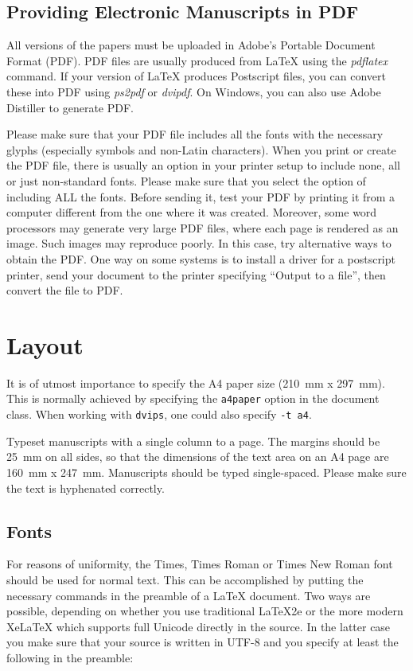 \documentclass{clarin}
\begin{document}
\subsection{Providing Electronic Manuscripts in PDF} \label{sect:pdf}

All versions of the papers must be uploaded in Adobe's
Portable Document Format (PDF). PDF files are usually produced from
LaTeX using the \textit{pdflatex} command. If your version of
LaTeX produces Postscript files, you can convert these into PDF
using \textit{ps2pdf} or \textit{dvipdf}. On Windows, you can also use
Adobe Distiller to generate PDF.

Please make sure that your PDF file includes all the fonts
with the necessary glyphs
(especially symbols and non-Latin
characters). When you print or create the PDF file, there is usually
an option in your printer setup to include none, all or just
non-standard fonts.  Please make sure that you select the option of
including ALL the fonts. Before sending it, test your PDF by
  printing it from a computer different from the one where it was
  created. Moreover, some word processors may generate very large PDF
files, where each page is rendered as an image. Such images may
reproduce poorly. In this case, try alternative ways to obtain the
PDF. One way on some systems is to install a driver for a postscript
printer, send your document to the printer specifying ``Output to a
file'', then convert the file to PDF.

\section{Layout} \label{ssec:layout}

It is of utmost importance to specify the A4 paper size (210~mm
x 297~mm). This is normally achieved by
specifying the \texttt{a4paper} option  in the document class.
When working with {\tt dvips}, one could also specify {\tt -t a4}.

Typeset manuscripts with a single column to a page.
The margins should be 25~mm on all sides, so that
the dimensions of the text area on an A4 page are 160~mm x 247~mm.
Manuscripts should be typed single-spaced.
Please make sure the text is hyphenated correctly.


\subsection{Fonts}

For reasons of uniformity, the Times, Times Roman or Times New Roman font should be
used for normal text. This can be accomplished by putting the necessary commands
in the preamble of a LaTeX document. Two ways are possible, depending on whether you
use traditional LaTeX2e or the more modern XeLaTeX which supports
full Unicode directly in the source. In the latter case you make sure that your source is written
in UTF-8 and you specify at least the following in the preamble:
\end{document}
